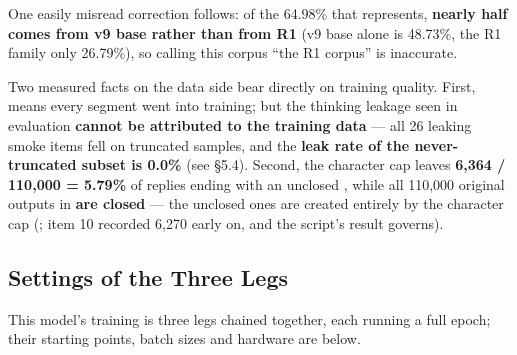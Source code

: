 \documentclass[11pt,openany]{article}
\begin{document}
One easily misread correction follows: of the 64.98\% that \linebreak[0] represents,
\textbf{nearly half comes from v9 base rather than from R1} (v9 base alone is 48.73\%, the R1
family only 26.79\%), so calling this corpus ``the R1 corpus'' is inaccurate.

Two measured facts on the data side bear directly on training quality. First,
\linebreak[0]\linebreak[0] means every  segment went into training; but the thinking
leakage seen in evaluation \textbf{cannot be attributed to the training data} --- all 26 leaking
smoke items fell on truncated samples, and the \textbf{leak rate of the never-truncated subset is
0.0\%} (see \S5.4). Second, the \linebreak[0] character cap leaves
\textbf{6{,}364 / 110{,}000 = 5.79\%} of replies ending with an unclosed , while all
110{,}000 original outputs in \linebreak[0] \textbf{are closed} --- the unclosed ones
are created entirely by the character cap (\linebreak[0]\linebreak[0]; 
item 10 recorded 6{,}270 early on, and the script's result governs).

\subsection{Settings of the Three Legs}

This model's training is three legs chained together, each running a full epoch; their starting
points, batch sizes and hardware are below.
\end{document}
